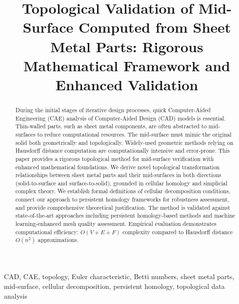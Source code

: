 \documentclass[conference]{IEEEtran}
\begin{document}
\title{Topological Validation of Mid-Surface Computed from Sheet Metal Parts: Rigorous Mathematical Framework and Enhanced Validation}
\author{
}
\maketitle

\begin{abstract}
During the initial stages of iterative design processes, quick Computer-Aided Engineering (CAE) analysis of Computer-Aided Design (CAD) models is essential. Thin-walled parts, such as sheet metal components, are often abstracted to mid-surfaces to reduce computational resources. The mid-surface must mimic the original solid both geometrically and topologically. Widely-used geometric methods relying on Hausdorff distance computation are computationally intensive and error-prone. This paper provides a rigorous topological method for mid-surface verification with enhanced mathematical foundations. We derive novel topological transformation relationships between sheet metal parts and their mid-surfaces in both directions (solid-to-surface and surface-to-solid), grounded in cellular homology and simplicial complex theory. We establish formal definitions of cellular decomposition conditions, connect our approach to persistent homology frameworks for robustness assessment, and provide comprehensive theoretical justification. The method is validated against state-of-the-art approaches including persistent homology-based methods and machine learning-enhanced mesh quality assessment. Empirical evaluation demonstrates computational efficiency: $O(V+E+F)$ complexity compared to Hausdorff distance $O(n^2)$ approximations.
\end{abstract} 

\begin{IEEEkeywords}
CAD, CAE, topology, Euler characteristic, Betti numbers, sheet metal parts, mid-surface, cellular decomposition, persistent homology, topological data analysis
\end{IEEEkeywords} 
\end{document}
